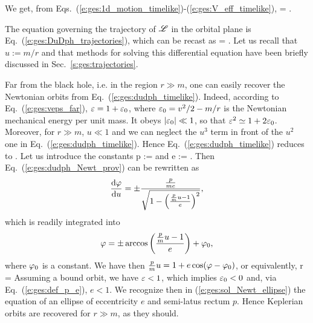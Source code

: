 We get, from Eqs.~(\ref{e:ges:1d_motion_timelike})-(\ref{e:ges:V_eff_timelike}),
\be
     = \pm
     .
\ee

The equation governing the trajectory of $\mathscr{L}$ in the orbital plane is
Eq.~(\ref{e:ges:DuDph_trajectories}), which can be recast as
\be  \label{e:ges:dudph_timelike}
      = \pm {} .
\ee
Let us recall that $u := m/r$ and that methods for solving this
differential equation have been briefly discussed in Sec.~\ref{s:ges:trajectories}.

\begin{remark}
Far from the black hole, i.e. in the region $r\gg m$, one can easily recover
the Newtonian orbits from Eq.~(\ref{e:ges:dudph_timelike}). Indeed, according to
Eq.~(\ref{e:ges:veps_far}), $\varepsilon = 1 + \varepsilon_0$, where $\varepsilon_0 = v^2/2 -m/r$  is
the Newtonian mechanical energy per unit mass. It obeys $|\varepsilon_0|\ll 1$, so that $\varepsilon^2 \simeq 1 + 2\varepsilon_0$.
Moreover, for $r\gg m$, $u\ll 1$ and we can neglect the $u^3$ term in front
of the $u^2$ one in Eq.~(\ref{e:ges:dudph_timelike}). Hence Eq.~(\ref{e:ges:dudph_timelike})
reduces to
\be \label{e:ges:dudph_Newt_prov}
      \simeq \pm {} .
\ee
Let us introduce the constants
\be \label{e:ges:def_p_e}
    p :=  \qquad\mbox{and}\qquad
    e :=  .
\ee
Then Eq.~(\ref{e:ges:dudph_Newt_prov}) can be rewritten as
\[
    \frac{\mathrm{d} \varphi}{\mathrm{d} u} = \pm \frac{\frac{p}{m e}}{\sqrt{1 - \left(\frac{\frac{p}{m}u-1}{e}\right) ^2}} ,
\]
which is readily integrated into
\[
    \varphi = \pm \arccos \left(\frac{\frac{p}{m}u-1}{e}\right) + \varphi_0 ,
\]
where $\varphi_0$ is a constant. We have then $\frac{p}{m} u = 1 + e\cos(\varphi-\varphi_0)$, or
equivalently,
\be \label{e:ges:sol_Newt_ellipse}
    r = 
\ee
Assuming a bound orbit, we have $\varepsilon < 1$, which implies $\varepsilon_0 < 0$
and, via Eq.~(\ref{e:ges:def_p_e}), $e<1$. We recognize then in (\ref{e:ges:sol_Newt_ellipse}) the equation
of an ellipse of eccentricity $e$ and semi-latus rectum $p$. Hence Keplerian orbits are recovered for $r\gg m$, as they should.
\end{remark}

